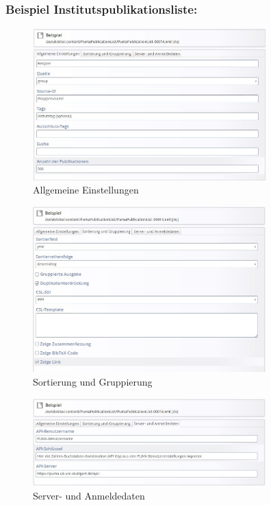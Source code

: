 \subsubsection*{Beispiel Institutspublikationsliste:}\label{sss:ipl}
\begin{figure}[h!]
 \centering
 \includegraphics[width=9cm]{Bilder/Kapitel9/Institutsliste1.JPG}
 \caption{Allgemeine Einstellungen}
 \label{fig:iplAllgemeineEinstellungen}
\end{figure}\begin{figure}[h!]
 \centering
 \includegraphics[width=9cm]{Bilder/Kapitel9/Institutsliste2.jpeg}
 \caption{Sortierung und Gruppierung}
 \label{fig:iplSortierungGruppierung}
\end{figure}\begin{figure}[h!]
 \centering
 \includegraphics[width=9cm]{Bilder/Kapitel9/Institutsliste3.jpeg}
 \caption{Server- und Anmeldedaten}
 \label{fig:iplServerAnmeldedaten}
\end{figure}

